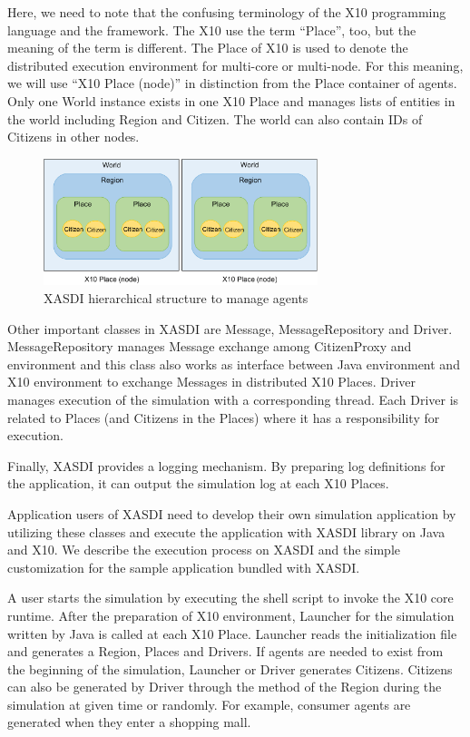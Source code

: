 Here, we need to note that the confusing terminology of the X10 programming language and the framework.
The X10 use the term ``Place'', too, but the meaning of the term is different.
The Place of X10 is used to denote the distributed execution environment for multi-core or multi-node.
For this meaning, we will use ``X10 Place (node)'' in distinction from the Place container of agents.
Only one World instance exists in one X10 Place and manages lists of entities in the world including Region and Citizen.
The world can also contain IDs of Citizens in other nodes.

\begin{figure}[h]
  \centering
  \includegraphics[width=8cm]{Figs.mizuta/xasdiclass.pdf}
  \caption{XASDI hierarchical structure to manage agents}
  \label{fig:Figs.mizuta/xasdiclass}
\end{figure}

Other important classes in XASDI are Message, MessageRepository and Driver.
MessageRepository manages Message exchange among CitizenProxy and environment and this class also works as interface between Java environment and X10 environment to exchange Messages in distributed X10 Places.
Driver manages execution of the simulation with a corresponding thread. Each Driver is related to Places (and Citizens in the Places) where it has a responsibility for execution.

Finally, XASDI provides a logging mechanism. By preparing log definitions for the application, it can output the simulation log at each X10 Places. 


Application users of XASDI need to develop their own simulation application by utilizing these classes and execute the application with XASDI library on Java and X10.
We describe the execution process on XASDI and the simple customization for the sample application bundled with XASDI.

A user starts the simulation by executing the shell script to invoke the X10 core runtime.
After the preparation of X10 environment, Launcher for the simulation written by Java is called at each X10 Place.
Launcher reads the initialization file and generates a Region, Places and Drivers.
If agents are needed to exist from the beginning of the simulation, Launcher or Driver generates Citizens.
Citizens can also be generated by Driver through the method of the Region during the simulation at given time or randomly. For example, consumer agents are generated when they enter a shopping mall.

